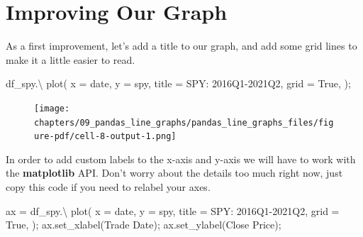 \documentclass[
  letterpaper,
  DIV=11,
  numbers=noendperiod]{scrreprt}
\newenvironment{Shaded}{\begin{snugshade}}{\end{snugshade}}
\newcommand{\NormalTok}[1]{\textcolor[rgb]{0.00,0.23,0.31}{#1}}
\newcommand{\OperatorTok}[1]{\textcolor[rgb]{0.37,0.37,0.37}{#1}}
\newcommand{\StringTok}[1]{\textcolor[rgb]{0.13,0.47,0.30}{#1}}
\newcommand{\VariableTok}[1]{\textcolor[rgb]{0.07,0.07,0.07}{#1}}
\begin{document}
\hypertarget{improving-our-graph}{%
\section{Improving Our Graph}\label{improving-our-graph}}

As a first improvement, let's add a title to our graph, and add some
grid lines to make it a little easier to read.

\begin{Shaded}
\begin{Highlighting}[]
\NormalTok{df\_spy.}\OperatorTok{\textbackslash{}}
\NormalTok{    plot(}
\NormalTok{        x }\OperatorTok{=} \StringTok{\textquotesingle{}date\textquotesingle{}}\NormalTok{,}
\NormalTok{        y }\OperatorTok{=} \StringTok{\textquotesingle{}spy\textquotesingle{}}\NormalTok{,}
\NormalTok{        title }\OperatorTok{=} \StringTok{\textquotesingle{}SPY: 2016Q1{-}2021Q2\textquotesingle{}}\NormalTok{,}
\NormalTok{        grid }\OperatorTok{=} \VariableTok{True}\NormalTok{,}
\NormalTok{    )}\OperatorTok{;}
\end{Highlighting}
\end{Shaded}

\begin{figure}[H]

{\centering \texttt{[image: chapters/09\_pandas\_line\_graphs/pandas\_line\_graphs\_files/figure-pdf/cell-8-output-1.png]}

}

\end{figure}

In order to add custom labels to the x-axis and y-axis we will have to
work with the \textbf{matplotlib} API. Don't worry about the details too
much right now, just copy this code if you need to relabel your axes.

\begin{Shaded}
\begin{Highlighting}[]
\NormalTok{ax }\OperatorTok{=}\NormalTok{ df\_spy.}\OperatorTok{\textbackslash{}}
\NormalTok{        plot(}
\NormalTok{            x }\OperatorTok{=} \StringTok{\textquotesingle{}date\textquotesingle{}}\NormalTok{,}
\NormalTok{            y }\OperatorTok{=} \StringTok{\textquotesingle{}spy\textquotesingle{}}\NormalTok{,}
\NormalTok{            title }\OperatorTok{=} \StringTok{\textquotesingle{}SPY: 2016Q1{-}2021Q2\textquotesingle{}}\NormalTok{,}
\NormalTok{            grid }\OperatorTok{=} \VariableTok{True}\NormalTok{,}
\NormalTok{        )}\OperatorTok{;}
\NormalTok{ax.set\_xlabel(}\StringTok{\textquotesingle{}Trade Date\textquotesingle{}}\NormalTok{)}\OperatorTok{;}
\NormalTok{ax.set\_ylabel(}\StringTok{\textquotesingle{}Close Price\textquotesingle{}}\NormalTok{)}\OperatorTok{;}
\end{Highlighting}
\end{Shaded}
\end{document}
